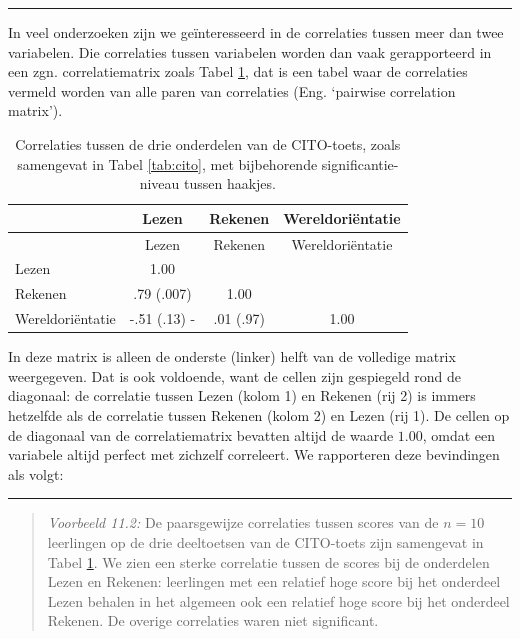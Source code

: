 \documentclass[
]{book}
\begin{document}
\begin{center}\rule{0.5\linewidth}{0.5pt}\end{center}

In veel onderzoeken zijn we geïnteresseerd in de correlaties tussen meer
dan twee variabelen. Die correlaties tussen variabelen worden dan vaak
gerapporteerd in een zgn. correlatiematrix zoals
Tabel \ref{tab:cito-correlaties}, dat is een tabel waar de correlaties
vermeld worden van alle paren van correlaties (Eng. `pairwise
correlation matrix').

\begin{longtable}[]{@{}lccc@{}}
\caption{\label{tab:cito-correlaties} Correlaties tussen de drie onderdelen van de CITO-toets, zoals
samengevat in Tabel \ref{tab:cito}, met bijbehorende significantie-niveau
tussen haakjes.}\tabularnewline
\toprule\noalign{}
& Lezen & Rekenen & Wereldoriëntatie \\
\midrule\noalign{}
\endfirsthead
\toprule\noalign{}
& Lezen & Rekenen & Wereldoriëntatie \\
\midrule\noalign{}
\endhead
\bottomrule\noalign{}
\endlastfoot
Lezen & 1.00 & & \\
Rekenen & .79 (.007) & 1.00 & \\
Wereldoriëntatie & -.51 (.13) - & .01 (.97) & 1.00 \\
\end{longtable}

In deze matrix is alleen de onderste (linker) helft van de volledige
matrix weergegeven. Dat is ook voldoende, want de cellen zijn gespiegeld
rond de diagonaal: de correlatie tussen Lezen (kolom 1) en Rekenen (rij
2) is immers hetzelfde als de correlatie tussen Rekenen (kolom 2) en Lezen
(rij 1). De cellen op de diagonaal van de correlatiematrix bevatten altijd
de waarde \(1.00\), omdat een variabele altijd perfect met zichzelf
correleert. We rapporteren deze bevindingen als volgt:

\begin{center}\rule{0.5\linewidth}{0.5pt}\end{center}

\begin{quote}
\emph{Voorbeeld 11.2:} De
paarsgewijze correlaties tussen scores van de \(n=10\) leerlingen op de
drie deeltoetsen van de CITO-toets zijn samengevat in
Tabel \ref{tab:cito-correlaties}. We zien een sterke correlatie tussen
de scores bij de onderdelen Lezen en Rekenen: leerlingen met een
relatief hoge score bij het onderdeel Lezen behalen in het algemeen ook
een relatief hoge score bij het onderdeel Rekenen. De overige
correlaties waren niet significant.
\end{quote}
\end{document}
